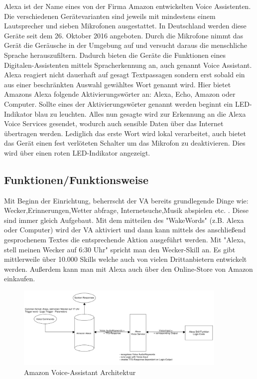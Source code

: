 Alexa ist der Name eines von der Firma Amazon entwickelten Voice Assistenten. Die verschiedenen Gerätevarianten sind jeweils mit mindestens einem Lautsprecher und sieben Mikrofonen ausgestattet. In Deutschland werden diese Geräte seit dem 26. Oktober 2016 angeboten. Durch die Mikrofone nimmt das Gerät die Geräusche in der Umgebung auf und versucht daraus die menschliche Sprache herauszufiltern. Dadurch bieten die Geräte die Funktionen eines Digitalen-Assistenten mittels Spracherkennung an, auch genannt Voice Assistant.
Alexa reagiert nicht dauerhaft auf gesagt Textpassagen sondern erst sobald ein aus einer beschränkten Auswahl gewähltes Wort genannt wird. Hier bietet Amazons Alexa folgende Aktivierungswörter an: Alexa, Echo, Amazon oder Computer. Sollte eines der Aktivierungswörter genannt werden beginnt ein LED-Indikator blau zu leuchten. Alles nun gesagte wird zur Erkennung an die Alexa Voice Services gesendet, wodurch auch sensible Daten über das Internet übertragen werden. Lediglich das erste Wort wird lokal verarbeitet, auch bietet das Gerät einen fest verlöteten Schalter um das Mikrofon zu deaktivieren. Dies wird über einen roten LED-Indikator angezeigt.\\

\subsection{Funktionen/Funktionsweise}
Mit Beginn der Einrichtung, beherrscht der VA bereits grundlegende Dinge wie: Wecker,Erinnerungen,Wetter abfrage, Internetsuche,Musik abspielen etc. . Diese sind immer gleich Aufgebaut. Mit dem mitteilen des "WakeWords" (z.B. Alexa oder Computer) wird der VA aktiviert und dann kann mittels des anschließend gesprochenem Textes die entsprechende Aktion ausgeführt werden. Mit "Alexa, stell meinen Wecker auf 6:30 Uhr" spricht man den Wecker-Skill an. Es gibt mittlerweile über 10.000 Skills welche auch von vielen Drittanbietern entwickelt werden. Außerdem kann man mit Alexa auch über den Online-Store von Amazon einkaufen.

\begin{figure}[H]
	\centering
	\includegraphics[width=0.9\textwidth]{content/img/AlexaVA_Architektur}
	\caption[Amazon Voice-Assistant Architektur]{Amazon Voice-Assistant Architektur}
\end{figure}

